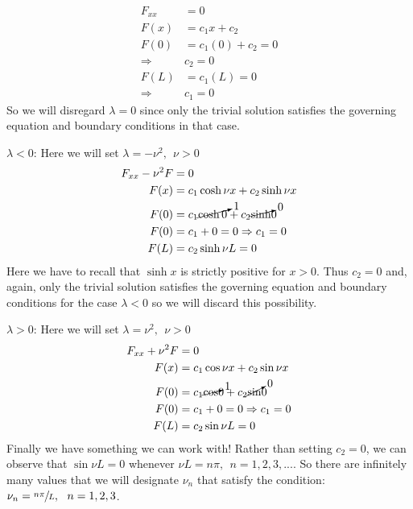 \begin{align*}
F_{xx} &= 0 \\
F(x) &= c_1x + c_2 \\
F(0) &= c_1(0) + c_2 = 0 \\
\Rightarrow & c_2 = 0 \\
F(L) &= c_1(L) = 0 \\
\Rightarrow & c_1 = 0
\end{align*}
So we will disregard $\lambda = 0$ since only the trivial solution satisfies the governing equation and boundary conditions in that case.

\vspace{0.25cm}

\noindent\underline{$\lambda < 0$}:  Here we will set $\lambda = -\nu^2, \ \ \nu>0$ 
\begin{align*}
F_{xx} - \nu^2 F &= 0 \\
F(x) &= c_1 \cosh{\nu x} + c_2 \sinh{\nu x} \\
F(0) &= c_1 \cancelto{1}{\cosh{0}} + c_2 \cancelto{0}\sinh{0} \\
F(0) &= c_1 + 0 = 0 \Rightarrow c_1 = 0 \\
F(L) &= c_2 \sinh{\nu L} = 0 \\
\end{align*}
Here we have to recall that $\sinh{x}$ is strictly positive for $x>0$.  Thus $c_2 = 0$ and, again, only the trivial solution satisfies the governing equation and boundary conditions for the case $\lambda < 0$ so we will discard this possibility.

\vspace{0.25cm}

\noindent\underline{$\lambda > 0$}:  Here we will set $\lambda = \nu^2, \ \ \nu>0$
\begin{align*}
F_{xx} + \nu^2 F &= 0 \\
F(x) &= c_1 \cos{\nu x} + c_2 \sin{\nu x} \\
F(0) &= c_1 \cancelto{1}\cos{0} + c_2 \cancelto{0}\sin{0} \\
F(0) &= c_1 + 0 = 0 \Rightarrow c_1 = 0 \\
F(L) &= c_2 \sin{\nu L} = 0
\end{align*}
Finally we have something we can work with!  Rather than setting $c_2 = 0$, we can observe that $\sin{\nu L} = 0$ whenever $\nu L = n \pi, \ \ n=1,2,3,...$.  So there are infinitely many values that we will designate $\nu_n$ that satisfy the condition: $\nu_n = \sfrac{n \pi}{L}, \ \ n = 1,2,3$.

